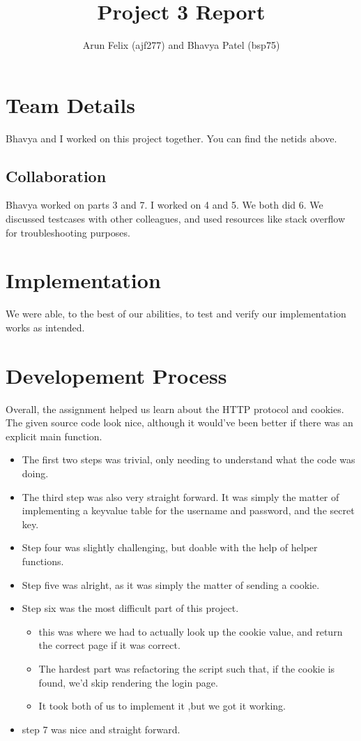 \documentclass{article}
\begin{document}
\title{Project 3 Report}
\author{Arun Felix (ajf277) and Bhavya Patel (bsp75)}
\maketitle

\section{Team Details}

Bhavya and I worked on this project together. You can find the netids above.

\subsection{Collaboration}
Bhavya worked on parts 3 and 7. I worked on 4 and 5. We both did 6. We discussed testcases with other colleagues, and used resources like stack overflow for troubleshooting purposes.

\section{Implementation}

We were able, to the best of our abilities, to test and verify our implementation works as intended.

\section{Developement Process}

Overall, the assignment helped us learn about the HTTP protocol and cookies. The given source code look nice, although it would've been better if there was an explicit main function.

\begin{itemize}
    \item The first two steps was trivial, only needing to understand what the code was doing.
    \item The third step was also very straight forward. It was simply the matter of implementing a keyvalue table for the username and password, and the secret key.
    \item Step four was slightly challenging, but doable with the help of helper functions.
    \item Step five was alright, as it was simply the matter of sending a cookie.
    \item Step six was the most difficult part of this project.
    \begin{itemize}
        \item this was where we had to actually look up the cookie value, and return the correct page if it was correct.
        \item The hardest part was refactoring the script such that, if the cookie is found, we'd skip rendering the login page. 
        \item It took both of us to implement it ,but we got it working. 
    \end{itemize}
    \item step 7 was nice and straight forward.
\end{itemize}
\end{document}
